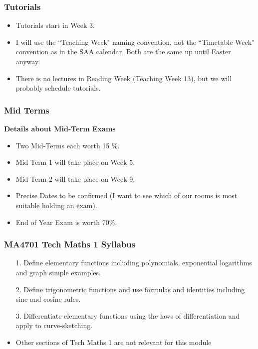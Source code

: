 \documentclass{beamer}
\begin{document}
\begin{frame}
\frametitle{Tutorials}

\begin{itemize}
\item Tutorials start in Week 3.

\item I will use the ``Teaching Week" naming convention, not the ``Timetable Week" convention as in the SAA calendar. Both are the same up until Easter anyway.

\item There is no lectures in Reading Week (Teaching Week 13), but we will probably schedule tutorials.

\end{itemize}
\end{frame}

\begin{frame}
	\frametitle{ Mid Terms }
	\textbf{Details about Mid-Term Exams}
	\begin{itemize}
		\item Two Mid-Terms each worth 15 \%.
		\item Mid Term 1 will take place on Week 5.
		\item Mid Term 2 will take place on Week 9.
		\item Precise Dates to be confirmed (I want to see which of our rooms is most suitable holding an exam).
		\item End of Year Exam is worth 70\%. 
	\end{itemize}
\end{frame}
\begin{frame}
	\frametitle{MA4701 Tech Maths 1 Syllabus}


\begin{itemize}

\item[1.] Define elementary functions including polynomials, exponential logarithms and graph simple examples. 

\item[2.] Define trigonometric functions and use formulas and identities including sine and cosine rules. 

\item[3.] Differentiate elementary functions using the laws of differentiation and apply to curve-sketching. 

\item Other sections of Tech Maths 1 are not relevant for this module
\end{itemize}
\end{frame}
\end{document}
